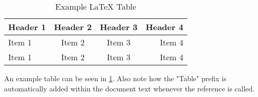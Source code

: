 \begin{table}[H]
   \caption{Example LaTeX Table} 
   \label{tab:example}
   \small %
   \centering %
   \begin{tabular}{lccr} %
   \toprule[\heavyrulewidth]\toprule[\heavyrulewidth]
   \textbf{Header 1} & \textbf{Header 2} & \textbf{Header 3} & \textbf{Header 4} \\ 
   \midrule
   Item 1 & Item 2 & Item 3 & Item 4 \\
   Item 1 & Item 2 & Item 3 & Item 4\\
   \bottomrule[\heavyrulewidth] 
   \end{tabular}
\end{table}

An example table can be seen in \ref{tab:example}.
Also note how the "Table" prefix is automatically added within the document text whenever the reference is called.